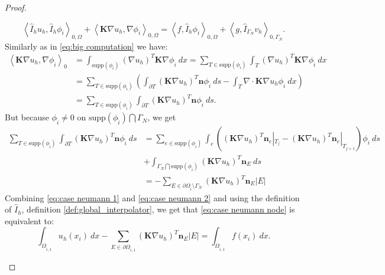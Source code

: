 \documentclass[../Main/main.tex]{subfiles}
\begin{document}
\begin{proof}
\begin{enumerate}
			\begin{equation}\label{eq:case neumann node}
				\left \langle \hat{I}_h u_h,\hat{I}_h \phi_i \right \rangle_{0,\Omega} +   \left \langle \pmb{K} \nabla u_h,\nabla \phi_i \right \rangle_{0,\Omega} = \left \langle f,\hat{I}_h \phi_i \right \rangle_{0,\Omega}+ \left \langle g,\hat{I}_{\Gamma_N} v_h \right \rangle_{0,\Gamma_N}.
			\end{equation}
			Similarly as in \eqref{eq:big computation} we have:
			\begin{equation}\label{eq:case neumann 1}
				\begin{aligned}
						\left \langle \pmb{K}\nabla u_h, \nabla \phi_{\hat{i}} \right \rangle_0 &= \int_{\text{supp}(\phi_{\hat{i}})} (\nabla u_h)^T \pmb{K}\nabla \phi_{\hat{i}} \ dx = \sum_{T\in \text{supp}(\phi_{\hat{i}})} \int_T (\nabla u_h)^T \pmb{K}\nabla \phi_{\hat{i}} \ dx \\
					&= \sum_{T\in \text{supp}(\phi_{\hat{i}})} \left ( \int_{\partial T} (\pmb{K}\nabla u_h)^T \pmb{n}\phi_{\hat{i}} \ ds-\int_T \nabla \cdot \pmb{K} \nabla u_h \phi_{\hat{i}} \ dx \right ) \\
					&=\sum_{T\in \text{supp}(\phi_{\hat{i}})}\int_{\partial T} (\pmb{K}\nabla u_h)^T \pmb{n}\phi_{\hat{i}} \ ds.
				\end{aligned}
			\end{equation}
			But because $\phi_{\hat{i}}\neq 0$ on $\text{supp}(\phi_{\hat{i}})\bigcap \Gamma_N$, we get
			\begin{equation}\label{eq:case neumann 2}
				\begin{aligned}
					\sum_{T\in \text{supp}(\phi_{\hat{i}})}\int_{\partial T} (\pmb{K}\nabla u_h)^T \pmb{n}\phi_{\hat{i}} \ ds &= \sum_{e\in \text{supp}(\phi_{\hat{i}})} \int_e ((\pmb{K}\nabla u_h)^T \pmb{n}_e|_{T_{j}} - (\pmb{K}\nabla u_h)^T \pmb{n}_e|_{T_{j+1}})\phi_i \ ds\\ &+ \int_{\Gamma_N \bigcap \text{supp}(\phi_{\hat{i}})}(\pmb{K}\nabla u_h)^T \pmb{n}_E \ ds\\
					&= -\sum_{E\in \partial \Omega_{\hat{i}}\setminus \Gamma_N} (\pmb{K}\nabla u_h)^T \pmb{n}_E |E|
				\end{aligned}
			\end{equation}
			Combining \eqref{eq:case neumann 1} and \eqref{eq:case neumann 2} and using the definition of $\hat{I}_h$, definition \ref{def:global_interpolator}, we get that \eqref{eq:case neumann node} is equivalent to:
			\begin{equation}\label{eq:FVML neumann node}
				\int_{\Omega_{\hat{i},1}}u_h(x_i) \ dx - \sum_{E\in \partial \Omega_{\hat{i},1}} (\pmb{K}\nabla u_h)^T \pmb{n}_E |E| = \int_{\Omega_{\hat{i},1}}f(x_i) \ dx.

\end{equation}
\end{enumerate}
\end{proof}
\end{document}
